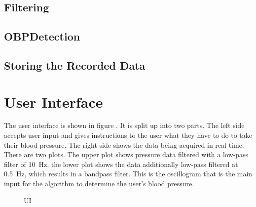 \subsection{Filtering}

\subsection{OBPDetection}

\subsection{Storing the Recorded Data}
%
%



\section{User Interface}
The user interface is shown in figure . It is split up into two parts. The left side accepts user input and gives instructions to the user what they have to do to take their blood pressure. The right side shows the data being acquired in real-time. There are two plots. The upper plot shows pressure data filtered with a low-pass filter of \SI{10}{\Hz}, the lower plot shows the data additionally low-pass filtered at \SI{0.5}{\Hz}, which results in a bandpass filter. This is the oscillogram that is the main input for the algorithm to determine the user's blood pressure.

\begin{figure}
\centering
\caption{UI}
\label{fig:UI}
\end{figure}

